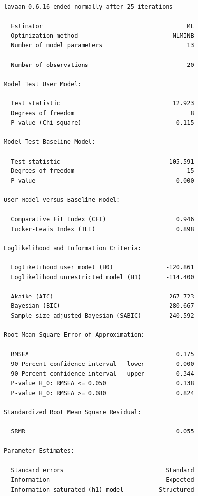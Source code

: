 \documentclass[
  letterpaper,
  DIV=11,
  numbers=noendperiod]{scrreprt}
\begin{document}
\begin{verbatim}
lavaan 0.6.16 ended normally after 25 iterations

  Estimator                                         ML
  Optimization method                           NLMINB
  Number of model parameters                        13

  Number of observations                            20

Model Test User Model:
                                                      
  Test statistic                                12.923
  Degrees of freedom                                 8
  P-value (Chi-square)                           0.115

Model Test Baseline Model:

  Test statistic                               105.591
  Degrees of freedom                                15
  P-value                                        0.000

User Model versus Baseline Model:

  Comparative Fit Index (CFI)                    0.946
  Tucker-Lewis Index (TLI)                       0.898

Loglikelihood and Information Criteria:

  Loglikelihood user model (H0)               -120.861
  Loglikelihood unrestricted model (H1)       -114.400
                                                      
  Akaike (AIC)                                 267.723
  Bayesian (BIC)                               280.667
  Sample-size adjusted Bayesian (SABIC)        240.592

Root Mean Square Error of Approximation:

  RMSEA                                          0.175
  90 Percent confidence interval - lower         0.000
  90 Percent confidence interval - upper         0.344
  P-value H_0: RMSEA <= 0.050                    0.138
  P-value H_0: RMSEA >= 0.080                    0.824

Standardized Root Mean Square Residual:

  SRMR                                           0.055

Parameter Estimates:

  Standard errors                             Standard
  Information                                 Expected
  Information saturated (h1) model          Structured


\end{verbatim}
\end{document}
